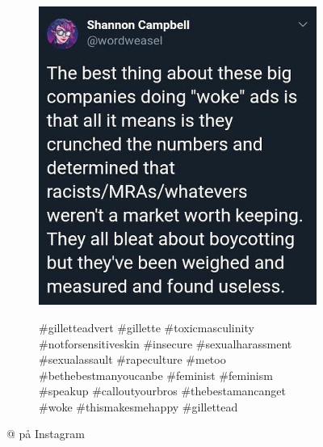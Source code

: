 \begin{figure}[H]
    \footnotesize
    \centering
    \begin{subfigure}[b]{0.48\linewidth}
        \includegraphics[width=\textwidth]{../data/cases/ad/2019-01-17_12-32-22_utc.jpg}
    \end{subfigure}
    \qquad
    \begin{subfigure}[b]{0.3\linewidth}

    \#gilletteadvert \#gillette \#toxicmasculinity 
    \#notforsensitiveskin \#insecure \#sexualharassment 
    \#sexualassault \#rapeculture \#metoo \#bethebestmanyoucanbe 
    \#feminist \#feminism \#speakup \#calloutyourbros 
    \#thebestamancanget \#woke \#thismakesmehappy \#gillettead

    \end{subfigure}
    \caption{@\citeauthor{elle_sciencekitty2019} på Instagram}
    \label{img:ad}
\end{figure}
